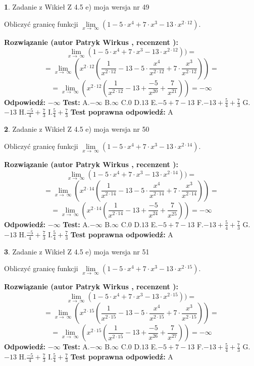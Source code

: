 \documentclass[12pt, a4paper]{article}
\theoremstyle{definition} %
\newtheorem{zad}{}
\newcommand{\zadStart}[1]{\begin{zad}#1\newline}
\newcommand{\zadStop}{\end{zad}}
\newcommand{\rozwStart}[2]{\noindent \textbf{Rozwiązanie (autor #1 , recenzent #2): }\newline}
\newcommand{\rozwStop}{\newline}
\newcommand{\odpStart}{\noindent \textbf{Odpowiedź:}\newline}
\newcommand{\odpStop}{\newline}
\newcommand{\testStart}{\noindent \textbf{Test:}\newline}
\newcommand{\testStop}{\newline}
\newcommand{\kluczStart}{\noindent \textbf{Test poprawna odpowiedź:}\newline}
\newcommand{\kluczStop}{\newline}
\begin{document}
\zadStart{Zadanie z Wikieł Z 4.5 e) moja wersja nr 49}



Obliczyć granicę funkcji  $\lim\limits_{x\to\ \infty}(1 - 5 \cdot x^{4}+7 \cdot x^{3}- 13 \cdot x^{2\cdot12})$.
\zadStop
\rozwStart{Patryk Wirkus}{}
$$\lim\limits_{x\to\ \infty}(1 - 5 \cdot x^{4}+7 \cdot x^{3}- 13 \cdot x^{2\cdot12}))=$$
$$=\lim\limits_{x\to\ \infty}(x^{2\cdot12}(\frac{1}{x^{2\cdot12}}-13 -5 \cdot \frac{x^{4}}{x^{2\cdot12}}+7 \cdot \frac{x^{3}}{x^{2\cdot12}}))=$$
$$=\lim\limits_{x\to\ \infty}(x^{2\cdot12}(\frac{1}{x^{2\cdot12}}-13 + \frac{-5}{x^{20}}+ \frac{7}{x^{21}}))=-\infty$$
\rozwStop
\odpStart
$-\infty$
\odpStop
\testStart
A.$-\infty$ B.$\infty$ C.$0$ D.$13$ E.$-5 + 7 - 13$
F.$-13+\frac{5}{4}+\frac{7}{3}$ G.$-13$
H.$\frac{-5}{4}+\frac{7}{3}$
I.$\frac{5}{4}+\frac{7}{3}$
\testStop
\kluczStart
A
\kluczStop



\zadStart{Zadanie z Wikieł Z 4.5 e) moja wersja nr 50}



Obliczyć granicę funkcji  $\lim\limits_{x\to\ \infty}(1 - 5 \cdot x^{4}+7 \cdot x^{3}- 13 \cdot x^{2\cdot14})$.
\zadStop
\rozwStart{Patryk Wirkus}{}
$$\lim\limits_{x\to\ \infty}(1 - 5 \cdot x^{4}+7 \cdot x^{3}- 13 \cdot x^{2\cdot14}))=$$
$$=\lim\limits_{x\to\ \infty}(x^{2\cdot14}(\frac{1}{x^{2\cdot14}}-13 -5 \cdot \frac{x^{4}}{x^{2\cdot14}}+7 \cdot \frac{x^{3}}{x^{2\cdot14}}))=$$
$$=\lim\limits_{x\to\ \infty}(x^{2\cdot14}(\frac{1}{x^{2\cdot14}}-13 + \frac{-5}{x^{24}}+ \frac{7}{x^{25}}))=-\infty$$
\rozwStop
\odpStart
$-\infty$
\odpStop
\testStart
A.$-\infty$ B.$\infty$ C.$0$ D.$13$ E.$-5 + 7 - 13$
F.$-13+\frac{5}{4}+\frac{7}{3}$ G.$-13$
H.$\frac{-5}{4}+\frac{7}{3}$
I.$\frac{5}{4}+\frac{7}{3}$
\testStop
\kluczStart
A
\kluczStop



\zadStart{Zadanie z Wikieł Z 4.5 e) moja wersja nr 51}



Obliczyć granicę funkcji  $\lim\limits_{x\to\ \infty}(1 - 5 \cdot x^{4}+7 \cdot x^{3}- 13 \cdot x^{2\cdot15})$.
\zadStop
\rozwStart{Patryk Wirkus}{}
$$\lim\limits_{x\to\ \infty}(1 - 5 \cdot x^{4}+7 \cdot x^{3}- 13 \cdot x^{2\cdot15}))=$$
$$=\lim\limits_{x\to\ \infty}(x^{2\cdot15}(\frac{1}{x^{2\cdot15}}-13 -5 \cdot \frac{x^{4}}{x^{2\cdot15}}+7 \cdot \frac{x^{3}}{x^{2\cdot15}}))=$$
$$=\lim\limits_{x\to\ \infty}(x^{2\cdot15}(\frac{1}{x^{2\cdot15}}-13 + \frac{-5}{x^{26}}+ \frac{7}{x^{27}}))=-\infty$$
\rozwStop
\odpStart
$-\infty$
\odpStop
\testStart
A.$-\infty$ B.$\infty$ C.$0$ D.$13$ E.$-5 + 7 - 13$
F.$-13+\frac{5}{4}+\frac{7}{3}$ G.$-13$
H.$\frac{-5}{4}+\frac{7}{3}$
I.$\frac{5}{4}+\frac{7}{3}$
\testStop
\kluczStart
A
\kluczStop
\end{document}
